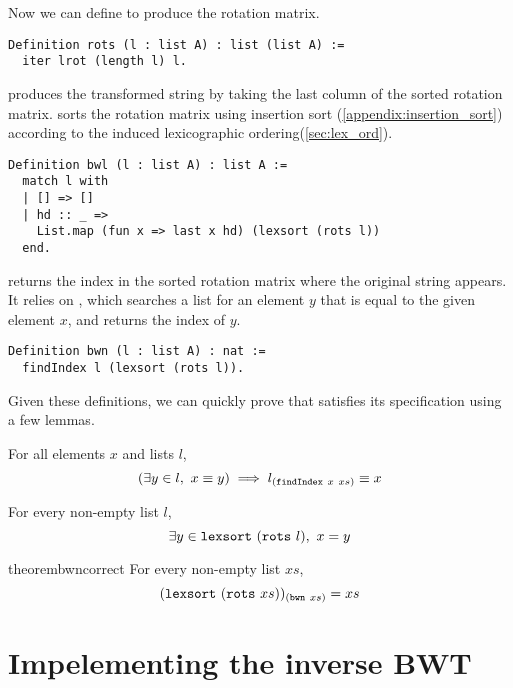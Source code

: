 \documentclass[sigplan,10pt,anonymous,review]{thesis}
\begin{document}
Now we can define  to produce the rotation matrix.
\begin{lstlisting}
Definition rots (l : list A) : list (list A) :=
  iter lrot (length l) l.
\end{lstlisting}

 produces the transformed string by taking the last column of
the sorted rotation matrix.  sorts the rotation matrix
using insertion sort (\cref{appendix:insertion_sort}) according to the
induced lexicographic ordering(\cref{sec:lex_ord}).
\begin{lstlisting}
Definition bwl (l : list A) : list A :=
  match l with
  | [] => []
  | hd :: _ =>
    List.map (fun x => last x hd) (lexsort (rots l))
  end.
\end{lstlisting}

 returns the index in the sorted rotation matrix where the
original string appears. It relies on , which searches
a list for an element $y$ that is equal to the given element $x$, and
returns the index of $y$.
\begin{lstlisting}
Definition bwn (l : list A) : nat :=
  findIndex l (lexsort (rots l)).
\end{lstlisting}

Given these definitions, we can quickly prove that 
satisfies its specification using a few lemmas.
\begin{lemma}
  For all elements $x$ and lists $l$,
  \begin{equation*}
    (\exists y \in l,~x \equiv y) \implies l_{(\texttt{\textup{findIndex}}~x~xs)} \equiv x
  \end{equation*}
\end{lemma}
\begin{lemma}
  For every non-empty list $l$,
  \begin{equation*}
    \exists y \in \texttt{\textup{lexsort}}~(\texttt{\textup{rots}}~l),~x = y
  \end{equation*}
\end{lemma}
\begin{restatable}{theorem}{bwncorrect}
  \label{thm:bwn_correct}
  For every non-empty list $xs$,
  \begin{equation*}
    (\texttt{\textup{lexsort}}~(\texttt{\textup{rots}}~xs))_{(\texttt{\textup{bwn}}~xs)} = xs
  \end{equation*}
\end{restatable}

\section{Impelementing the inverse BWT}
\label{sec:inverse_BWT}
\end{document}
